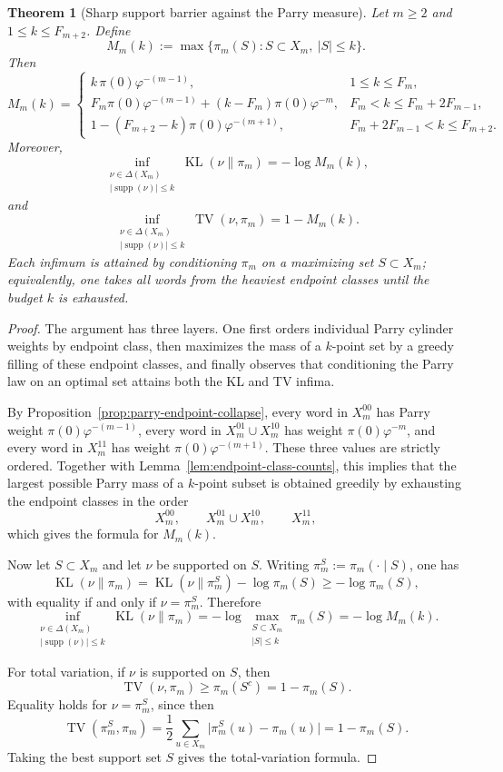 \documentclass[11pt,letterpaper]{article}
\numberwithin{equation}{section}
\theoremstyle{plain}
\newtheorem{theorem}{Theorem}[section]
\theoremstyle{definition}
\theoremstyle{remark}
\DeclareMathOperator{\TV}{TV}
\DeclareMathOperator{\KL}{KL}
\DeclareMathOperator{\supp}{supp}
\begin{document}
\begin{theorem}[Sharp support barrier against the Parry measure]\label{thm:parry-support-barrier}
Let \(m\ge 2\) and \(1\le k\le F_{m+2}\). Define
\[
M_m(k):=\max\{\pi_m(S):S\subset X_m,\ |S|\le k\}.
\]
Then
\[
M_m(k)=
\begin{cases}
k\,\pi(0)\varphi^{-(m-1)},
& 1\le k\le F_m,\\[0.4em]
F_m\pi(0)\varphi^{-(m-1)}+(k-F_m)\pi(0)\varphi^{-m},
& F_m<k\le F_m+2F_{m-1},\\[0.4em]
1-(F_{m+2}-k)\pi(0)\varphi^{-(m+1)},
& F_m+2F_{m-1}<k\le F_{m+2}.
\end{cases}
\]
Moreover,
\[
\inf_{\substack{\nu\in\Delta(X_m)\\ |\supp(\nu)|\le k}}\KL(\nu\|\pi_m)
=
-\log M_m(k),
\]
and
\[
\inf_{\substack{\nu\in\Delta(X_m)\\ |\supp(\nu)|\le k}}\TV(\nu,\pi_m)
=
1-M_m(k).
\]
Each infimum is attained by conditioning \(\pi_m\) on a maximizing set
\(S\subset X_m\); equivalently, one takes all words from the heaviest endpoint
classes until the budget \(k\) is exhausted.
\end{theorem}

\begin{proof}
The argument has three layers. One first orders individual Parry cylinder
weights by endpoint class, then maximizes the mass of a \(k\)-point set by a
greedy filling of these endpoint classes, and finally observes that
conditioning the Parry law on an optimal set attains both the KL and TV
infima.

By Proposition~\ref{prop:parry-endpoint-collapse}, every word in \(X_m^{00}\) has
Parry weight \(\pi(0)\varphi^{-(m-1)}\), every word in \(X_m^{01}\cup X_m^{10}\)
has weight \(\pi(0)\varphi^{-m}\), and every word in \(X_m^{11}\) has weight
\(\pi(0)\varphi^{-(m+1)}\). These three values are strictly ordered. Together
with Lemma~\ref{lem:endpoint-class-counts}, this implies that the largest
possible Parry mass of a \(k\)-point subset is obtained greedily by exhausting
the endpoint classes in the order
\[
X_m^{00},\qquad X_m^{01}\cup X_m^{10},\qquad X_m^{11},
\]
which gives the formula for \(M_m(k)\).

Now let \(S\subset X_m\) and let \(\nu\) be supported on \(S\). Writing
\(\pi_m^S:=\pi_m(\cdot\mid S)\), one has
\[
\KL(\nu\|\pi_m)
=
\KL(\nu\|\pi_m^S)-\log \pi_m(S)
\ge
-\log \pi_m(S),
\]
with equality if and only if \(\nu=\pi_m^S\). Therefore
\[
\inf_{\substack{\nu\in\Delta(X_m)\\ |\supp(\nu)|\le k}}\KL(\nu\|\pi_m)
=
-\log\max_{\substack{S\subset X_m\\ |S|\le k}}\pi_m(S)
=
-\log M_m(k).
\]

For total variation, if \(\nu\) is supported on \(S\), then
\[
\TV(\nu,\pi_m)
\ge
\pi_m(S^c)
=
1-\pi_m(S).
\]
Equality holds for \(\nu=\pi_m^S\), since then
\[
\TV(\pi_m^S,\pi_m)
=
\frac12\sum_{u\in X_m}\bigl|\pi_m^S(u)-\pi_m(u)\bigr|
=
1-\pi_m(S).
\]
Taking the best support set \(S\) gives the total-variation formula.
\end{proof}
\end{document}
